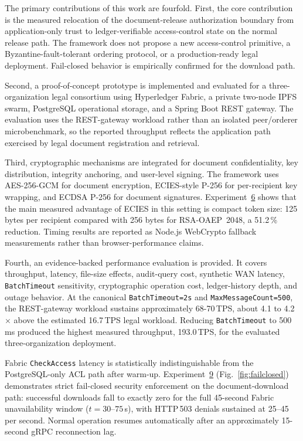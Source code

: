 \documentclass{ieeeaccess}
\begin{document}
The primary contributions of this work are fourfold. First, the core
contribution is the measured relocation of the document-release
authorization boundary from application-only trust to ledger-verifiable
access-control state on the normal release path. The framework does not
propose a new access-control primitive, a Byzantine-fault-tolerant ordering
protocol, or a production-ready legal deployment. Fail-closed behavior is
empirically confirmed for the download path.

Second, a proof-of-concept prototype is implemented and evaluated for a
three-organization legal consortium using Hyperledger Fabric, a
private two-node IPFS swarm, PostgreSQL operational storage, and a
Spring Boot REST gateway. The evaluation uses the REST-gateway
workload rather than an isolated peer/orderer microbenchmark, so the
reported throughput reflects the application path exercised by legal
document registration and retrieval.

Third, cryptographic mechanisms are integrated for document
confidentiality, key distribution, integrity anchoring, and user-level
signing. The framework uses AES-256-GCM for document encryption,
ECIES-style P-256 for per-recipient key wrapping, and ECDSA P-256 for
document signatures. Experiment~\hyperref[sec:exp_crypto]{6} shows that the main measured
advantage of ECIES in this setting is compact token size: 125 bytes
per recipient compared with 256 bytes for RSA-OAEP~2048, a
51.2\,\% reduction. Timing results are reported as Node.js WebCrypto
fallback measurements rather than browser-performance claims.

Fourth, an evidence-backed performance evaluation is provided. It covers
throughput, latency, file-size effects, audit-query cost, synthetic WAN
latency, \texttt{BatchTimeout} sensitivity, cryptographic operation cost,
ledger-history depth, and outage behavior. At the canonical
\texttt{BatchTimeout=2s} and \texttt{MaxMessageCount=500}, the REST-gateway
workload sustains approximately 68-70\,TPS, about 4.1 to 4.2$\times$ above the estimated
16.7\,TPS legal workload. Reducing \texttt{BatchTimeout} to 500\,ms produced
the highest measured throughput, 193.0\,TPS, for the evaluated
three-organization deployment.

Fabric \texttt{CheckAccess} latency is statistically indistinguishable from
the PostgreSQL-only ACL path after warm-up. Experiment~\hyperref[sec:exp_failclosed]{9}
(Fig.~\ref{fig:failclosed}) demonstrates strict fail-closed security
enforcement on the document-download path: successful downloads fall to
exactly zero for the full 45-second Fabric unavailability window
($t = 30$--$75$\,s), with HTTP\,503 denials sustained at 25--45 per second.
Normal operation resumes automatically after an approximately 15-second gRPC
reconnection lag.
\end{document}
